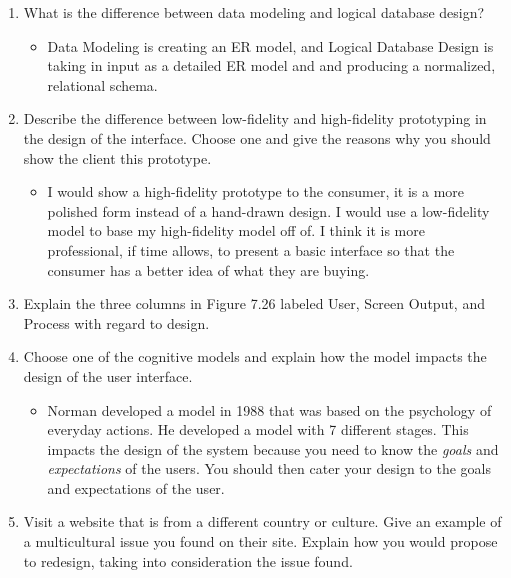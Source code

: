 \documentclass[11pt]{article}
\begin{document}
\begin{enumerate}
    \item What is the difference between data modeling and logical database design?
    \begin{itemize}
        \item[] Data Modeling is creating an ER model, and Logical Database Design is taking in input as a detailed ER model and and producing a normalized, relational schema.
    \end{itemize}

    \item Describe the difference between low-fidelity and high-fidelity prototyping in the design of the interface. Choose one and give the reasons why you should show the client this prototype. 
    \begin{itemize}
        \item[] I would show a high-fidelity prototype to the consumer, it is a more polished form instead of a hand-drawn design. I would use a low-fidelity model to base my high-fidelity model
        off of. I think it is more professional, if time allows, to present a basic interface so that the consumer has a better idea of what they are buying.
    \end{itemize}

    \item Explain the three columns in Figure 7.26 labeled User, Screen Output, and Process with regard to design. 

    \item Choose one of the cognitive models and explain how the model impacts the design of the user interface. 
    \begin{itemize}
        \item Norman developed a model in 1988 that was based on the psychology of everyday actions. He developed a model with 7 different stages. This impacts the design of the system because you
        need to know the \textit{goals} and \textit{expectations} of the users. You should then cater your design to the goals and expectations of the user. 
    \end{itemize}


    \item Visit a website that is from a different country or culture. Give an example of a multicultural 
    issue you found on their site. Explain how you would propose to redesign, taking into consideration the issue found. 
    
    \end{enumerate}
    
    
\end{document}
